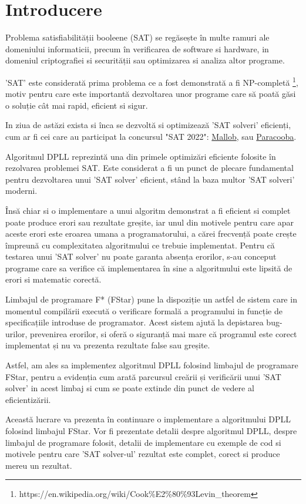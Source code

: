 \chapter*{Introducere} 

Problema satisfiabilității booleene (SAT) se regăsește în multe ramuri ale \linebreak domeniului informaticii, precum în verificarea de software si hardware, in domeniul criptografiei si securității sau optimizarea si analiza altor programe.

'SAT' este considerată prima problema ce a fost demonstrată a fi NP-completă \footnote{https://en.wikipedia.org/wiki/Cook\%E2\%80\%93Levin\_theorem}, motiv pentru care este importantă dezvoltarea unor programe care să poată găsi o soluție cât mai rapid, eficient si sigur. 

In ziua de astăzi exista si înca se dezvoltă si optimizează 'SAT solveri' eficienți, cum ar fi cei care au participat la concursul "SAT 2022": \href{https://www.dominikschreiber.de/papers/2022-mallob.pdf}{Mallob}, sau \href{https://github.com/maximaximal/Paracooba#readme
}{Paracooba}.

Algoritmul DPLL reprezintă una din primele optimizări eficiente folosite în \linebreak rezolvarea problemei SAT. Este considerat a fi un punct de plecare fundamental pentru \linebreak dezvoltarea unui 'SAT solver' eficient, stând la baza multor 'SAT solveri' moderni.

Însă chiar si o implementare a unui algoritm demonstrat a fi eficient si complet poate produce erori sau rezultate greșite, iar unul din motivele pentru care apar aceste erori este eroarea umana a programatorului, a cărei frecvență poate crește împreună cu complexitatea algoritmului ce trebuie implementat. Pentru că testarea unui 'SAT solver' nu poate garanta absența erorilor, s-au conceput programe care sa verifice că implementarea în sine a algoritmului este lipsită de erori si matematic corectă.

Limbajul de programare F* (FStar) pune la dispoziție un astfel de sistem care in momentul compilării execută o verificare formală a programului in funcție de \linebreak specificațiile introduse de programator. Acest sistem ajută la depistarea bug-urilor, prevenirea erorilor, si oferă o siguranță mai mare că programul este corect \linebreak implementat și nu va prezenta rezultate false sau greșite.

Astfel, am ales sa implementez algoritmul DPLL folosind limbajul de programare FStar, pentru a evidenția cum arată parcursul creării și verificării unui 'SAT solver' in acest limbaj si cum se poate extinde din punct de vedere al eficientizării.

Această lucrare va prezenta în continuare o implementare a algoritmului DPLL folosind limbajul FStar. Vor fi prezentate detalii despre algoritmul DPLL, despre limbajul de programare folosit, detalii de implementare cu exemple de cod si motivele pentru care 'SAT solver-ul' rezultat este complet, corect si produce mereu un rezultat.


